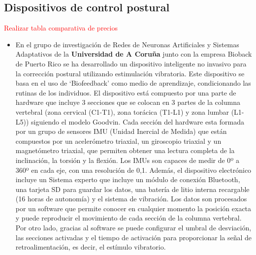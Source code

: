 \subsection{Dispositivos de control postural} 
\textcolor{red}{Realizar tabla comparativa de precios}
\begin{itemize}
    \item En el grupo de investigación de Redes de Neuronas Artificiales y Sistemas Adaptativos de la \textbf{Universidad de A Coruña} junto con la empresa Bioback de Puerto Rico se ha desarrollado un dispositivo inteligente no invasivo para la corrección postural utilizando estimulación vibratoria\cite{dispUAC}. Este dispositivo se basa en el uso de ‘Biofeedback’ como medio de aprendizaje, condicionando las rutinas de los individuos.  \newline El dispositivo está compuesto por una parte de hardware que incluye 3 secciones que se colocan en 3 partes de la columna vertebral (zona cervical (C1-T1), zona torácica (T1-L1) y zona lumbar (L1-L5)) siguiendo el modelo Goodvin. Cada sección del hardware esta formada por un grupo de sensores IMU (Unidad Inercial de Medida) que están compuestos por un acelerómetro triaxial, un giroscopio triaxial y un magnetómetro triaxial, que permiten obtener una lectura completa de la inclinación, la torsión y la flexión. Los IMUs son capaces de medir de 0º a 360º en cada eje, con una resolución de 0,1. Además, el dispositivo electrónico incluye un Sistema experto que incluye un módulo de conexión Bluetooth, una tarjeta SD para guardar los datos, una batería de litio interna recargable (16 horas de autonomía) y el sistema de vibración.  \newline Los datos son procesados por un software que permite conocer en cualquier momento la posición exacta y puede reproducir el movimiento de cada sección de la columna vertebral. Por otro lado, gracias al software se puede configurar el umbral de desviación, las secciones activadas y el tiempo de activación para proporcionar la señal de retroalimentación, es decir, el estímulo vibratorio. 



\end{itemize}
